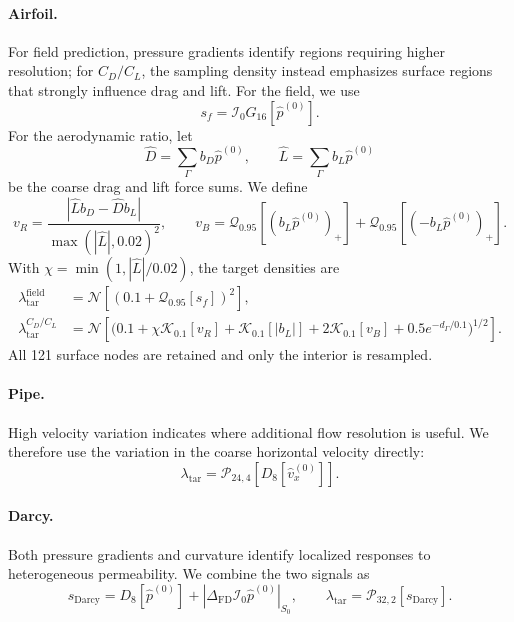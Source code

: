 \documentclass{article}
\begin{document}
\paragraph{Airfoil.}
For field prediction, pressure gradients identify regions requiring higher
resolution; for $C_D/C_L$, the sampling density instead emphasizes surface
regions that strongly influence drag and lift. For the field, we use
\[
    s_f
    =\mathcal{I}_0G_{16}[\widehat p^{(0)}].
\]
For the aerodynamic ratio, let
\[
    \widehat D=\sum_\Gamma b_D\widehat p^{(0)},
    \qquad
    \widehat L=\sum_\Gamma b_L\widehat p^{(0)}
\]
be the coarse drag and lift force sums. We define
\begin{equation}
    v_R
    =\frac{|\widehat Lb_D-\widehat Db_L|}{\max(|\widehat L|,0.02)^2},
    \qquad
    v_B
    =\mathcal{Q}_{0.95}[(b_L\widehat p^{(0)})_+]
     +\mathcal{Q}_{0.95}[(-b_L\widehat p^{(0)})_+].
    \label{eq:app_density_airfoil_signals}
\end{equation}
With
$\chi=\min(1,|\widehat L|/0.02)$, the target densities are
\begin{equation}
    \begin{aligned}
    \lambda_{\mathrm{tar}}^{\mathrm{field}}
       &=\mathcal{N}\!\left[
          (0.1+\mathcal{Q}_{0.95}[s_f])^{2}
          \right],\\
    \lambda_{\mathrm{tar}}^{C_D/C_L}
       &=\mathcal{N}\!\left[
          \bigl(
          0.1+\chi\mathcal{K}_{0.1}[v_R]
          +\mathcal{K}_{0.1}[|b_L|]
          +2\mathcal{K}_{0.1}[v_B]
          +0.5e^{-d_\Gamma/0.1}
          \bigr)^{1/2}
          \right].
    \end{aligned}
    \label{eq:app_density_airfoil_ratio}
\end{equation}
All 121 surface nodes are retained and only the interior is resampled.

\paragraph{Pipe.}
High velocity variation indicates where additional flow resolution is useful.
We therefore use the variation in the coarse horizontal velocity directly:
\begin{equation}
    \lambda_{\mathrm{tar}}
    =\mathcal{P}_{24,4}
       [D_8[\widehat v_x^{(0)}]].
    \label{eq:app_cpg_pipe_density}
\end{equation}

\paragraph{Darcy.}
Both pressure gradients and curvature identify localized responses to
heterogeneous permeability. We combine the two signals as
\begin{equation}
    s_{\mathrm{Darcy}}
    =D_8[\widehat p^{(0)}]
     +|\Delta_{\mathrm{FD}}
        \mathcal{I}_0\widehat p^{(0)}|_{S_0},
    \qquad
    \lambda_{\mathrm{tar}}
    =\mathcal{P}_{32,2}[s_{\mathrm{Darcy}}].
    \label{eq:app_cpg_darcy_density}
\end{equation}
\end{document}
